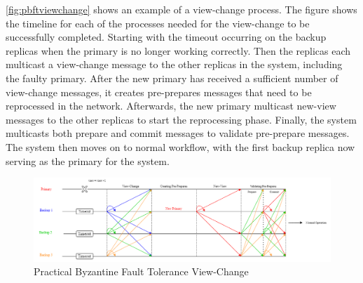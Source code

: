 \autoref{fig:pbftviewchange} shows an example of a view-change process. The figure shows the timeline for each of the processes needed for the view-change to be successfully completed. Starting with the timeout occurring on the backup replicas when the primary is no longer working correctly. Then the replicas each multicast a view-change message to the other replicas in the system, including the faulty primary. After the new primary has received a sufficient number of view-change messages, it creates pre-prepares messages that need to be reprocessed in the network. Afterwards, the new primary multicast new-view messages to the other replicas to start the reprocessing phase. Finally, the system multicasts both prepare and commit messages to validate pre-prepare messages. The system then moves on to normal workflow, with the first backup replica now serving as the primary for the system.


\begin{figure}[!h]
	\centering
	\includegraphics[width=1.1\textwidth]{figures/PBFTViewChange}
	\caption{Practical Byzantine Fault Tolerance View-Change}
	\label{fig:pbftviewchange}
\end{figure}

